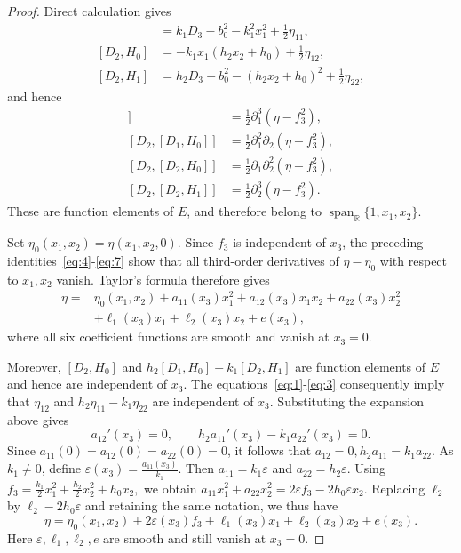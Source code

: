 \documentclass{tCON2e}
\newenvironment{revision}{\begingroup\color{black}}{\endgroup}
\numberwithin{equation}{section}
\theoremstyle{journalplain}
\theoremstyle{journaldef}
\newenvironment{revision}{}{}
\begin{document}
\begin{revision}
\begin{proof}
Direct calculation gives
\begin{align}
[D_1,H_0]
&=k_1D_3-b_0^2-k_1^2x_1^2+\tfrac12\eta_{11},\label{eq:1}\\
[D_2,H_0]
&=-k_1x_1(h_2x_2+h_0)+\tfrac12\eta_{12},\label{eq:2}\\
[D_2,H_1]
&=h_2D_3-b_0^2-(h_2x_2+h_0)^2+\tfrac12\eta_{22},\label{eq:3}
\end{align}
and hence
\begin{align}
[D_1,[D_1,H_0]]
&=\tfrac12\partial_1^3(\eta-f_3^2),\label{eq:4}\\
[D_2,[D_1,H_0]]
&=\tfrac12\partial_1^2\partial_2(\eta-f_3^2),\label{eq:5}\\
[D_2,[D_2,H_0]]
&=\tfrac12\partial_1\partial_2^2(\eta-f_3^2),\label{eq:6}\\
[D_2,[D_2,H_1]]
&=\tfrac12\partial_2^3(\eta-f_3^2).\label{eq:7}
\end{align}
These are function elements of $E$, and therefore belong to
$\operatorname{span}_{\mathbb R}\{1,x_1,x_2\}$.

Set $\eta_0(x_1,x_2)=\eta(x_1,x_2,0)$.
Since $f_3$ is independent of $x_3$, the preceding identities~\ref{eq:4}-\ref{eq:7}
show that all third-order derivatives of $\eta-\eta_0$
with respect to $x_1,x_2$ vanish. Taylor's formula therefore gives
\[
\begin{aligned}
\eta={}&\eta_0(x_1,x_2)
+a_{11}(x_3)x_1^2+a_{12}(x_3)x_1x_2+a_{22}(x_3)x_2^2\\
&+\ell_1(x_3)x_1+\ell_2(x_3)x_2+e(x_3),
\end{aligned}
\]
where all six coefficient functions are smooth and vanish
at $x_3=0$.

Moreover,
\(
[D_2,H_0]\) and \(
h_2[D_1,H_0]-k_1[D_2,H_1]
\)
are function elements of $E$ and hence are independent of $x_3$.
The equations~\ref{eq:1}-\ref{eq:3} consequently imply that
$\eta_{12}$ and $h_2\eta_{11}-k_1\eta_{22}$ are independent of $x_3$.
Substituting the expansion above gives
\[
a_{12}'(x_3)=0,
\qquad
h_2a_{11}'(x_3)-k_1a_{22}'(x_3)=0.
\]
Since $a_{11}(0)=a_{12}(0)=a_{22}(0)=0$, it follows that
\(
a_{12}=0,
h_2a_{11}=k_1a_{22}.
\)
As $k_1\ne0$, define
\(
\varepsilon(x_3)=\frac{a_{11}(x_3)}{k_1}.
\)
Then $a_{11}=k_1\varepsilon$ and $a_{22}=h_2\varepsilon$.
Using
\(
f_3=\frac{k_1}{2}x_1^2+\frac{h_2}{2}x_2^2+h_0x_2,
\)
we obtain
\(
a_{11}x_1^2+a_{22}x_2^2
=2\varepsilon f_3-2h_0\varepsilon x_2.
\)
Replacing $\ell_2$ by $\ell_2-2h_0\varepsilon$ and retaining
the same notation, we thus have
\[
\eta=\eta_0(x_1,x_2)+2\varepsilon(x_3)f_3
+\ell_1(x_3)x_1+\ell_2(x_3)x_2+e(x_3).
\]
Here $\varepsilon,\ell_1,\ell_2,e$ are smooth and still vanish
at $x_3=0$.


\end{proof}
\end{revision}
\end{document}
